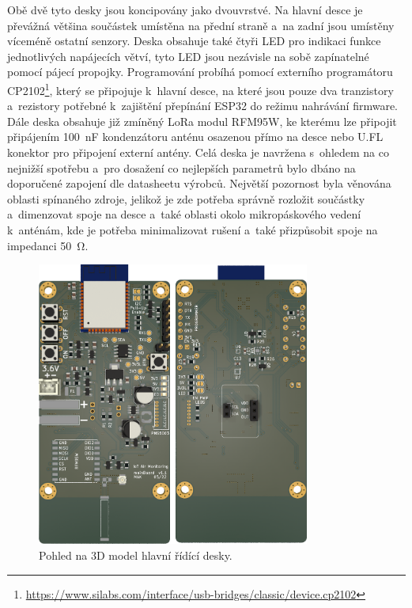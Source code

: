 Obě dvě tyto desky jsou koncipovány jako dvouvrstvé. Na hlavní desce je převážná většina součástek umístěna na přední straně a~na zadní jsou umístěny víceméně ostatní senzory. Deska obsahuje také čtyři LED pro indikaci funkce jednotlivých napájecích větví, tyto LED jsou nezávisle na sobě zapínatelné pomocí pájecí propojky. Programování probíhá pomocí externího programátoru CP2102\footnote{\url{https://www.silabs.com/interface/usb-bridges/classic/device.cp2102}}, který se připojuje k~hlavní desce, na které jsou pouze dva tranzistory a~rezistory potřebné k~zajištění přepínání ESP32 do režimu nahrávání firmware. Dále deska obsahuje již zmíněný LoRa modul RFM95W, ke kterému lze připojit připájením \SI{100}{\nano\farad} kondenzátoru anténu osazenou přímo na desce nebo U.FL konektor pro připojení externí antény. Celá deska je navržena s~ohledem na co nejnižší spotřebu a~pro dosažení co nejlepších parametrů bylo dbáno na doporučené zapojení dle datasheetu výrobců. Největší pozornost byla věnována oblasti spínaného zdroje, jelikož je zde potřeba správně rozložit součástky a~dimenzovat spoje na desce a~také oblasti okolo mikropáskového vedení k~anténám, kde je potřeba minimalizovat rušení a~také přizpůsobit spoje na impedanci \SI{50}{\ohm}.

\begin{figure}
    \centering
    \includegraphics[width=0.8\textwidth]{obrazky/mainBoard-kicad.png}
    \caption{Pohled na 3D model hlavní řídící desky.}
    \label{fig_mainBoardKicadRender}
\end{figure}


